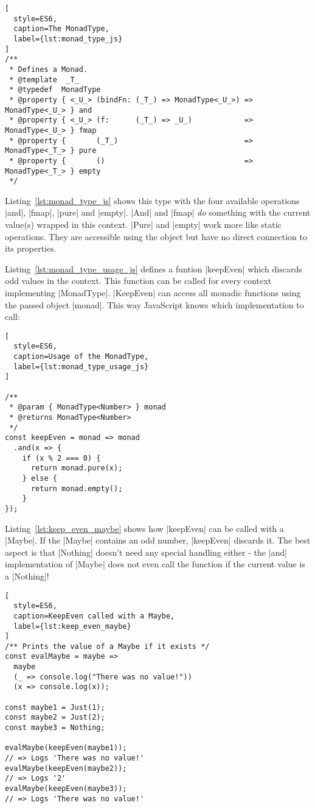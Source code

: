 \begin{lstlisting}[
  style=ES6,
  caption=The MonadType,
  label={lst:monad_type_js}
]
/**
 * Defines a Monad.
 * @template  _T_
 * @typedef  MonadType
 * @property { <_U_> (bindFn: (_T_) => MonadType<_U_>) => MonadType<_U_> } and
 * @property { <_U_> (f:      (_T_) => _U_)            => MonadType<_U_> } fmap
 * @property {       (_T_)                             => MonadType<_T_> } pure
 * @property {       ()                                => MonadType<_T_> } empty
 */
\end{lstlisting}

Listing~\ref{lst:monad_type_js} shows this type with the four available
operations |and|, |fmap|, |pure| and |empty|. |And| and |fmap| \textit{do}
something with the current value(s) wrapped in this context. |Pure| and |empty|
work more like static operations. They are accessible using the object but have
no direct connection to its properties. 

Listing~\ref{lst:monad_type_usage_js} defines a funtion |keepEven| which
discards odd values in the context. This function can be called for every
context implementing |MonadType|. |KeepEven| can access all monadic functions
using the passed object |monad|. This way JavaScript knows which implementation
to call:
\begin{lstlisting}[
  style=ES6,
  caption=Usage of the MonadType,
  label={lst:monad_type_usage_js}
]

/**
 * @param { MonadType<Number> } monad
 * @returns MonadType<Number>
 */
const keepEven = monad => monad
  .and(x => {
    if (x % 2 === 0) {
      return monad.pure(x);
    } else {
      return monad.empty();
    }
}); 
\end{lstlisting}

Listing~\ref{lst:keep_even_maybe} shows how |keepEven| can be called with a
|Maybe|. If the |Maybe| contains an odd number, |keepEven| discards it. The
best aspect is that |Nothing| doesn't need any special handling either - the
|and| implementation of |Maybe| does not even call the function if the current
value is a |Nothing|!

\begin{lstlisting}[
  style=ES6,
  caption=KeepEven called with a Maybe,
  label={lst:keep_even_maybe}
]
/** Prints the value of a Maybe if it exists */
const evalMaybe = maybe =>
  maybe
  (_ => console.log("There was no value!"))
  (x => console.log(x));

const maybe1 = Just(1);
const maybe2 = Just(2);
const maybe3 = Nothing;

evalMaybe(keepEven(maybe1));
// => Logs 'There was no value!'
evalMaybe(keepEven(maybe2));
// => Logs '2'
evalMaybe(keepEven(maybe3));
// => Logs 'There was no value!'
\end{lstlisting}

